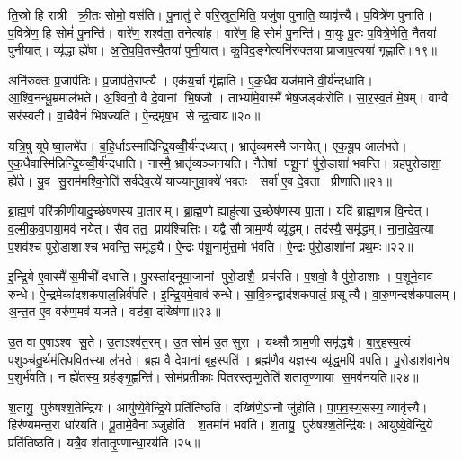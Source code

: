 ति॒स्रो हि रात्री क्री॒तः सोमो॒ वस॑ति। पु॒नातु॑ ते परि॒स्रुत॒मिति॒ यजु॑षा पुनाति॒ व्यावृ॑त्त्यै। प॒वित्रे॑ण पुनाति। प॒वित्रे॑ण॒ हि सोमं॑ पु॒नन्ति॑। वारे॑ण॒ शश्व॑ता॒ तनेत्या॑ह। वारे॑ण॒ हि सोमं॑ पु॒नन्ति॑। वा॒युः पू॒तः प॒वित्रे॒णेति॒ नैतया॑ पुनीयात्। व्यृ॑द्धा॒ ह्ये॑षा। अ॒ति॒प॒वि॒तस्यै॒तया॑ पुनी॒यात्। कु॒विद॒ङ्गेत्यनि॑रुक्तया प्राजाप॒त्यया॑ गृह्णाति॥१९॥

अनि॑रुक्तः प्र॒जाप॑तिः। प्र॒जाप॑ते॒राप्त्यै। एक॑य॒र्चा गृ॑ह्णाति। ए॒क॒धैव यज॑माने वी॒र्य॑न्दधाति। आ॒श्वि॒नन्धू॒म्रमाल॑भते। अ॒श्विनौ॒ वै दे॒वानां भि॒षजौ। ताभ्या॑मे॒वास्मै॑ भेष॒जङ्क॑रोति। सा॒र॒स्व॒तं मे॒षम्। वाग्वै सर॑स्वती। वा॒चैवैनं॑ भिषज्यति। ऐ॒न्द्रमृ॑ष॒भ सेन्द्र॒त्वाय॑॥२०॥\anuvakamend[अक्ष्यो॒र्लोमा॑नि॒ हिर॑ण्यव्वँसति गृह्णाति भिषज्य॒त्येक॑ञ्च]

यत्रि॒षु यूपेष्वा॒लभे॑त। ब॒हि॒र्धाऽस्मा॑दिन्द्रि॒यव्वीँ॒र्य॑न्दध्यात्। भ्रातृ॑व्यमस्मै जनयेत्। ए॒क॒यू॒प आल॑भते। ए॒क॒धैवास्मि॑न्निन्द्रि॒यव्वीँ॒र्य॑न्दधाति। नास्मै॒ भ्रातृ॑व्यञ्जनयति। नैतेषां पशू॒नां पु॑रो॒डाशा॑ भवन्ति। ग्रह॑पुरोडाशा॒ ह्ये॑ते। यु॒व सु॒राम॑मश्वि॒नेति॑ सर्वदेव॒त्ये॑ याज्यानुवा॒क्ये॑ भवतः। सर्वा॑ ए॒व दे॒वता प्रीणाति॥२१॥

ब्रा॒ह्म॒णं परि॑क्रीणीयादु॒च्छेष॑णस्य पा॒तारम्। ब्रा॒ह्म॒णो ह्याहु॑त्या उ॒च्छेष॑णस्य पा॒ता। यदि॑ ब्राह्म॒णन्न वि॒न्देत्। व॒ल्मी॒क॒व॒पाया॒मव॑ नयेत्। सैव तत॒ प्राय॑श्चित्तिः। यद्वै सौत्राम॒ण्यै व्यृ॑द्धम्। तद॑स्यै॒ समृ॑द्धम्। ना॒ना॒दे॒व॒त्या प॒शव॑श्च पुरो॒डाशाश्च भवन्ति॒ समृ॑द्ध्यै। ऐ॒न्द्रः प॑शू॒नामु॑त्त॒मो भ॑वति। ऐ॒न्द्रः पु॑रो॒डाशा॑नां प्रथ॒मः॥२२॥

इ॒न्द्रि॒ये ए॒वास्मै॑ स॒मीची॑ दधाति। पु॒रस्ता॑दनूया॒जानां पुरो॒डाशै॒ प्रच॑रति। प॒शवो॒ वै पु॑रो॒डाशाः। प॒शूने॒वाव॑ रुन्धे। ऐ॒न्द्रमेका॑दशकपाल॒न्निर्व॑पति। इ॒न्द्रि॒यमे॒वाव॑ रुन्धे। सा॒वि॒त्रन्द्वाद॑शकपालं॒ प्रसूत्यै। वा॒रु॒णन्दश॑कपालम्। अ॒न्त॒त ए॒व वरु॑ण॒मव॑ यजते। वड॑बा॒ दख्षि॑णा॥२३॥

उ॒त वा ए॒षाऽश्व सू॒ते। उ॒ताऽश्व॑त॒रम्। उ॒त सोम॑ उ॒त सुरा। यथ्सौत्राम॒णी समृ॑द्ध्यै। बा॒र्॒ह॒स्प॒त्यं प॒शुञ्च॑तु॒र्थम॑तिपवि॒तस्या ल॑भते। ब्रह्म॒ वै दे॒वानां॒ बृह॒स्पति॑। ब्रह्म॑णै॒व य॒ज्ञस्य॒ व्यृ॑द्ध॒मपि॑ वपति। पु॒रो॒डाश॑वाने॒ष प॒शुर्भ॑वति। न ह्ये॑तस्य॒ ग्रह॑ङ्गृ॒ह्णन्ति॑। सोम॑प्रतीकाः पितरस्तृप्णु॒तेति॑ शतातृ॒ण्णाया स॒मव॑नयति॥२४॥

श॒तायु॒ पुरु॑षश्श॒तेन्द्रि॑यः। आयु॑ष्ये॒वेन्द्रि॒ये प्रति॑तिष्ठति। दख्षि॑णे॒ऽग्नौ जु॑होति। पा॒प॒व॒स्य॒सस्य॒ व्यावृ॑त्त्यै। हिर॑ण्यमन्त॒रा धा॑रयति। पू॒तामे॒वैनाञ्जुहोति। श॒तमा॑नं भवति। श॒तायु॒ पुरु॑षश्श॒तेन्द्रि॑यः। आयु॑ष्ये॒वेन्द्रि॒ये प्रति॑तिष्ठति। यत्रै॒व श॑तातृ॒ण्णान्धा॒रय॑ति॥२५॥

